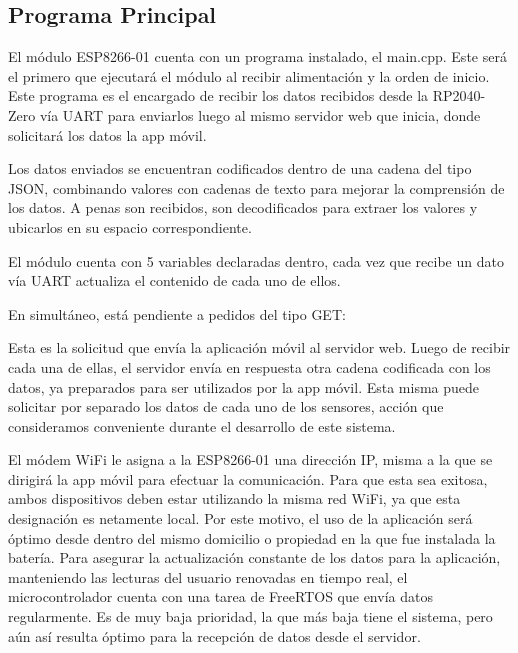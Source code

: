             \subsection{Programa Principal}
                El módulo ESP8266-01 cuenta con un programa instalado, el main.cpp. Este será el primero que ejecutará el módulo al recibir alimentación y la orden de inicio.
            	Este programa es el encargado de recibir los datos recibidos desde la RP2040-Zero vía UART para enviarlos luego al mismo servidor web que inicia, donde solicitará los datos la app móvil.\par
            	Los datos enviados se encuentran codificados dentro de una cadena del tipo JSON, combinando valores con cadenas de texto para mejorar la comprensión de los datos. A penas son recibidos, son decodificados para extraer los valores y ubicarlos en su espacio correspondiente.\par
            	El módulo cuenta con 5 variables declaradas dentro, cada vez que recibe un dato vía UART actualiza el contenido de cada uno de ellos.\par
            	En simultáneo, está pendiente a pedidos del tipo GET:\par
                
                
                
                Esta es la solicitud que envía la aplicación móvil al servidor web. Luego de recibir cada una de ellas, el servidor envía en respuesta otra cadena codificada con los datos, ya preparados para ser utilizados por la app móvil.
                Esta misma puede solicitar por separado los datos de cada uno de los sensores, acción que consideramos conveniente durante el desarrollo de este sistema.\par
                El módem WiFi le asigna a la ESP8266-01 una dirección IP, misma a la que se dirigirá la app móvil para efectuar la comunicación. Para que esta sea exitosa, ambos dispositivos deben estar utilizando la misma red WiFi, ya que esta designación es netamente local. Por este motivo, el uso de la aplicación será óptimo desde dentro del mismo domicilio o propiedad en la que fue instalada la batería.
                Para asegurar la actualización constante de los datos para la aplicación, manteniendo las lecturas del usuario renovadas en tiempo real, el microcontrolador cuenta con una tarea de FreeRTOS que envía datos regularmente. Es de muy baja prioridad, la que más baja tiene el sistema, pero aún así resulta óptimo para la recepción de datos desde el servidor.\par